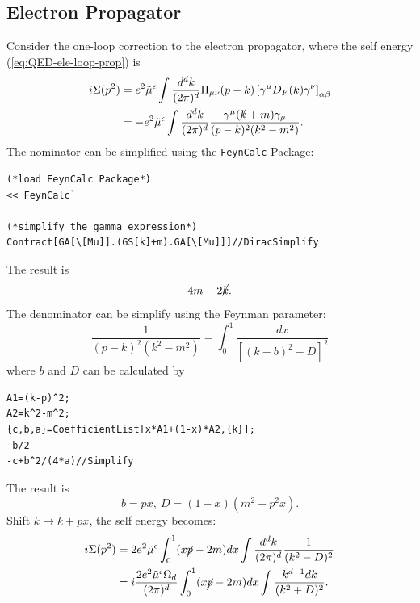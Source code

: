 \subsection{Electron Propagator}
Consider the one-loop correction to the electron propagator, where the self energy (\ref{eq:QED-ele-loop-prop}) is
\begin{equation}
\begin{aligned}
	i\Sigma(p^2)
	&= e^2\tilde{\mu}^{\epsilon}\int\frac{d^d k}{(2\pi)^d} \Pi_{\mu\nu}(p-k) \left[\gamma^\mu D_F(k) \gamma^\nu \right]_{\alpha\beta} \\
	&= -e^2\tilde{\mu}^{\epsilon}\int\frac{d^d k}{(2\pi)^d}\frac{\gamma^\mu(\cancel{k}+m)\gamma_\mu}{(p-k)^2(k^2-m^2)}.
\end{aligned}
\end{equation}
The nominator can be simplified using the \texttt{FeynCalc} Package:
\begin{lstlisting}[style=mathematicaFrameTB]
(*load FeynCalc Package*)
<< FeynCalc`

(*simplify the gamma expression*)
Contract[GA[\[Mu]].(GS[k]+m).GA[\[Mu]]]//DiracSimplify	
\end{lstlisting}
The result is
\begin{equation*}
	4 m-2\cancel{k}.
\end{equation*}
The denominator can be simplify using the Feynman parameter:
\begin{equation*}
	\frac{1}{(p-k)^2(k^2-m^2)} = \int_0^1 \frac{dx}{\left[(k-b)^2-D\right]^2}
\end{equation*}
where $b$ and $D$ can be calculated by
\begin{lstlisting}[style=mathematicaFrameTB]
A1=(k-p)^2;
A2=k^2-m^2;
{c,b,a}=CoefficientList[x*A1+(1-x)*A2,{k}];
-b/2
-c+b^2/(4*a)//Simplify
\end{lstlisting}
The result is
\begin{equation*}
	b = p x,\ 
	D = (1-x)(m^2-p^2 x).
\end{equation*}
Shift $k \rightarrow k + px$, the self energy becomes:
\begin{equation}
\begin{aligned}
	i\Sigma(p^2)
	&= 2e^2\tilde{\mu}^{\epsilon} 
		\int_0^1 (x\cancel{p}-2m)dx 
		\int \frac{d^d k}{(2\pi)^d} 
		\frac{1}{(k^2-D)^2} \\
	&= i\frac{2e^2 \tilde{\mu}^{\epsilon}\Omega_d}{(2\pi)^d}
		\int_0^1 (x\cancel{p}-2m)dx
		\int \frac{k^{d-1} dk}{(k^2+D)^2}.
\end{aligned}
\end{equation}
